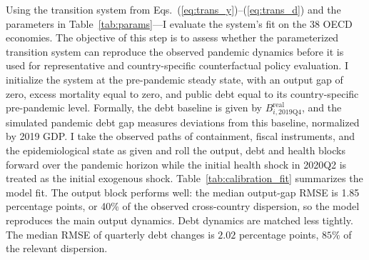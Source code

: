 \documentclass[12pt, a4paper]{article}
\begin{document}
Using the transition system from Eqs.~(\ref{eq:trans_y})--(\ref{eq:trans_d}) and the parameters in Table~\ref{tab:params}---I evaluate the system's fit on the 38 OECD economies. The objective of this step is to assess whether the parameterized transition system can reproduce the observed pandemic dynamics before it is used for representative and country-specific counterfactual policy evaluation. I initialize the system at the pre-pandemic steady state, with an output gap of zero, excess mortality equal to zero, and public debt equal to its country-specific pre-pandemic level. Formally, the debt baseline is given by $B^{\text{real}}_{i,2019\text{Q}4}$, and the simulated pandemic debt gap measures deviations from this baseline, normalized by 2019 GDP. I take the observed paths of containment, fiscal instruments, and the epidemiological state as given and roll the output, debt and health blocks forward over the pandemic horizon while the initial health shock in 2020Q2 is treated as the initial exogenous shock. Table~\ref{tab:calibration_fit} summarizes the model fit. The output block performs well: the median output-gap RMSE is 1.85 percentage points, or 40\% of the observed cross-country dispersion, so the model reproduces the main output dynamics. Debt dynamics are matched less tightly. The median RMSE of quarterly debt changes is $2.02$ percentage points, $85\%$ of the relevant dispersion. 
\end{document}
